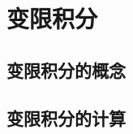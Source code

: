 \documentclass[8pt a4paper, oneside, UTF8]{ctexbook}
\begin{document}
\begin{sloppypar}
    \else
    \fi
    \chapter{变限积分}
    \section{变限积分的概念}
    \section{变限积分的计算}
    \ifx\allfiles\undefined
\end{sloppypar}
\end{document}
